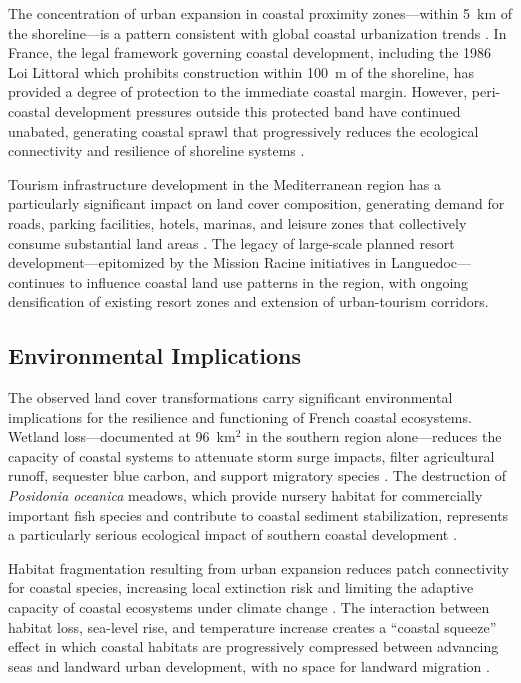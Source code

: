 \documentclass[remotesensing,article,submit,pdftex,moreauthors]{Definitions/mdpi}
\begin{document}
The concentration of urban expansion in coastal proximity zones—within 5~km of the shoreline—is a pattern consistent with global coastal urbanization trends \citep{Vousdoukas2020, FutureUrban2020}. In France, the legal framework governing coastal development, including the 1986 Loi Littoral which prohibits construction within 100~m of the shoreline, has provided a degree of protection to the immediate coastal margin. However, peri-coastal development pressures outside this protected band have continued unabated, generating coastal sprawl that progressively reduces the ecological connectivity and resilience of shoreline systems \citep{Perrin2016}.

Tourism infrastructure development in the Mediterranean region has a particularly significant impact on land cover composition, generating demand for roads, parking facilities, hotels, marinas, and leisure zones that collectively consume substantial land areas \citep{Burak2004}. The legacy of large-scale planned resort development—epitomized by the Mission Racine initiatives in Languedoc—continues to influence coastal land use patterns in the region, with ongoing densification of existing resort zones and extension of urban-tourism corridors.

\subsection{Environmental Implications}

The observed land cover transformations carry significant environmental implications for the resilience and functioning of French coastal ecosystems. Wetland loss—documented at 96~km$^2$ in the southern region alone—reduces the capacity of coastal systems to attenuate storm surge impacts, filter agricultural runoff, sequester blue carbon, and support migratory species \citep{Sanchez2015, EEA2019}. The destruction of \textit{Posidonia oceanica} meadows, which provide nursery habitat for commercially important fish species and contribute to coastal sediment stabilization, represents a particularly serious ecological impact of southern coastal development \citep{IPCC2022med}.

Habitat fragmentation resulting from urban expansion reduces patch connectivity for coastal species, increasing local extinction risk and limiting the adaptive capacity of coastal ecosystems under climate change \citep{Petzold2024}. The interaction between habitat loss, sea-level rise, and temperature increase creates a ``coastal squeeze'' effect in which coastal habitats are progressively compressed between advancing seas and landward urban development, with no space for landward migration \citep{Vousdoukas2020, IPCC2022med}.
\end{document}
